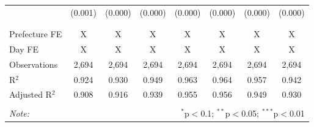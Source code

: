 \begin{table}[!htbp]
\begin{tabular}{@{\extracolsep{5pt}}lccccccc}
  & (0.001) & (0.000) & (0.000) & (0.000) & (0.000) & (0.000) & (0.000) \\ 
  & & & & & & & \\ 
\hline \\[-1.8ex] 
Prefecture FE & X & X & X & X & X & X & X \\ 
Day FE & X & X & X & X & X & X & X \\ 
Observations & 2,694 & 2,694 & 2,694 & 2,694 & 2,694 & 2,694 & 2,694 \\ 
R$^{2}$ & 0.924 & 0.930 & 0.949 & 0.963 & 0.964 & 0.957 & 0.942 \\ 
Adjusted R$^{2}$ & 0.908 & 0.916 & 0.939 & 0.955 & 0.956 & 0.949 & 0.930 \\ 
\hline 
\hline \\[-1.8ex] 
\textit{Note:}  & \multicolumn{7}{r}{$^{*}$p$<$0.1; $^{**}$p$<$0.05; $^{***}$p$<$0.01} \\ 
\end{tabular} 
\end{table} 
